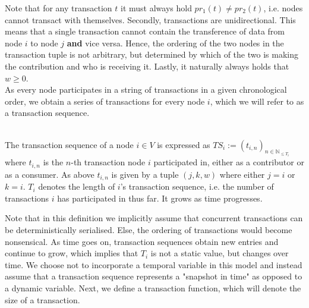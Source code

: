 \noindent{}Note that for any transaction $t$ it must always hold $pr_1(t)\neq{}pr_2(t)$, i.e. nodes cannot transact with themselves. Secondly, transactions are unidirectional. This means that a single transaction cannot contain the transference of data from node $i$ to node $j$ {\bf and} vice versa. Hence, the ordering of the two nodes in the transaction tuple is not arbitrary, but determined by which of the two is making the contribution and who is receiving it. Lastly, it naturally always holds that $w\geq{}0$. \\

\noindent{}As every node participates in a string of transactions in a given chronological order, we obtain a series of transactions for every node $i$, which we will refer to as a transaction sequence.\vspace{1em}\\

\begin{definition}\ \\
\label{def:Transaction Sequence}
\noindent{}The transaction sequence of a node $i\in{}V$ is expressed as $TS_i:=(t_{i,n})_{n\in\mathbb{N}_{\leq{}T_i}}$ where $t_{i,n}$ is the $n$-th transaction node $i$ participated in, either as a contributor or as a consumer. As above $t_{i,n}$ is given by a tuple $(j,k,w)$ where either $j=i$ or $k=i$. $T_i$ denotes the length of $i$'s transaction sequence, i.e. the number of transactions $i$ has participated in thus far. It grows as time progresses.\vspace{1em}\\
\end{definition}

\noindent{}Note that in this definition we implicitly assume that concurrent transactions can be deterministically serialised. Else, the ordering of transactions would become nonsensical. As time goes on, transaction sequences obtain new entries and continue to grow, which implies that $T_i$ is not a static value, but changes over time. We choose not to incorporate a temporal variable in this model and instead assume that a transaction sequence represents a "snapshot in time" as opposed to a dynamic variable. Next, we define a transaction function, which will denote the size of a transaction.\vspace{1em}\\


